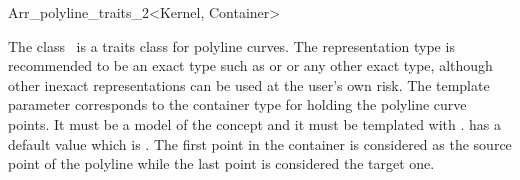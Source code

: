 
\ccRefPageBegin

\begin{ccRefClass}{Arr_polyline_traits_2<Kernel, Container>}

\ccDefinition
    The class \ccRefName\ is a traits class for polyline curves.  The
    representation type  is recommended to be an exact type
    such as  or 
    or any other exact type, although other inexact representations
    can be used at the user's own risk.  The template parameter
     corresponds to the container type for holding the
    polyline curve points. It must be a model of the  concept and it must be templated with
    .  has a default value which is
    . The first point in the container
    is considered as the source point of the polyline while the last
    point is considered the target one.


\ccIsModel
     

\end{ccRefClass}



\ccRefPageEnd
